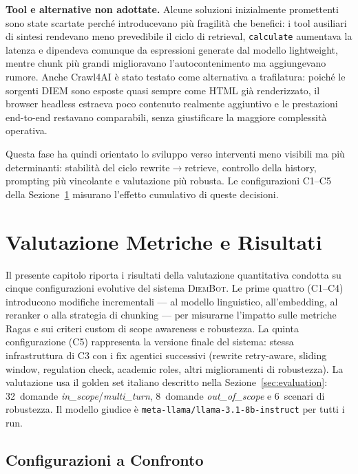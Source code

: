 \documentclass[11pt,a4paper]{article}
\newcommand{\code}[1]{\texttt{\small#1}}
\newcommand{\sys}{\textsc{DiemBot}}
\begin{document}
\textbf{Tool e alternative non adottate.} Alcune soluzioni inizialmente promettenti sono
state scartate perché introducevano più fragilità che benefici: i tool ausiliari di
sintesi rendevano meno prevedibile il ciclo di retrieval, \code{calculate} aumentava la
latenza e dipendeva comunque da espressioni generate dal modello lightweight, mentre chunk
più grandi miglioravano l'autocontenimento ma aggiungevano rumore. Anche Crawl4AI è stato
testato come alternativa a trafilatura: poiché
le sorgenti DIEM sono esposte quasi sempre come HTML già renderizzato, il browser headless
estraeva poco contenuto realmente aggiuntivo e le prestazioni end-to-end restavano
comparabili, senza giustificare la maggiore complessità operativa.

Questa fase ha quindi orientato lo sviluppo verso interventi meno visibili ma più
determinanti: stabilità del ciclo rewrite$\to$retrieve, controllo della history,
prompting più vincolante e valutazione più robusta. Le configurazioni C1--C5 della
Sezione~\ref{sec:eval_results} misurano l'effetto cumulativo di queste decisioni.

\section{Valutazione Metriche e Risultati}
\label{sec:eval_results}

Il presente capitolo riporta i risultati della valutazione quantitativa condotta su
cinque configurazioni evolutive del sistema \sys{}. Le prime quattro (C1--C4)
introducono modifiche incrementali --- al modello linguistico, all'embedding, al reranker
o alla strategia di chunking --- per misurarne l'impatto sulle metriche Ragas e sui
criteri custom di scope awareness e robustezza. La quinta configurazione (C5)
rappresenta la versione finale del sistema: stessa infrastruttura di C3 con i fix
agentici successivi (rewrite retry-aware, sliding window,
regulation check, academic roles, altri miglioramenti di robustezza). La valutazione usa
il golden set italiano descritto nella Sezione~\ref{sec:evaluation}: 32~domande
\emph{in\_scope}/\emph{multi\_turn}, 8~domande \emph{out\_of\_scope} e 6~scenari di
robustezza. Il modello giudice è \code{meta-llama/llama-3.1-8b-instruct} per tutti i run.

\subsection{Configurazioni a Confronto}
\label{subsec:eval_configs}
\end{document}
